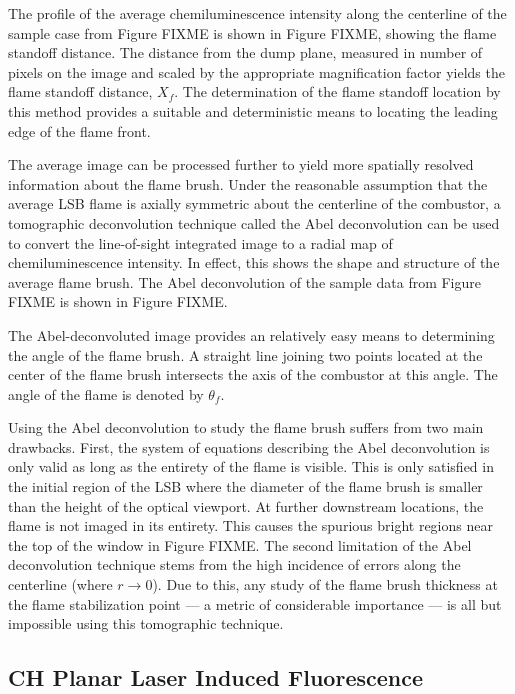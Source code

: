 The profile of the average chemiluminescence intensity along the centerline of the sample case from Figure FIXME is shown in Figure FIXME, showing the flame standoff distance.
The distance from the dump plane, measured in number of pixels on the image and scaled by the appropriate magnification factor yields the flame standoff distance, \(X_f\).
The determination of the flame standoff location by this method provides a suitable and deterministic means to locating the leading edge of the flame front.

The average image can be processed further to yield more spatially resolved information about the flame brush.
Under the reasonable assumption that the average LSB flame is axially symmetric about the centerline of the combustor, a tomographic deconvolution technique called the Abel deconvolution\cite{1992-dasch} can be used to convert the line-of-sight integrated image to a radial map of chemiluminescence intensity.
In effect, this shows the shape and structure of the average flame brush.
The Abel deconvolution of the sample data from Figure FIXME is shown in Figure FIXME.

The Abel-deconvoluted image provides an relatively easy means to determining the angle of the flame brush.
A straight line joining two points located at the center of the flame brush intersects the axis of the combustor at this angle.
The angle of the flame is denoted by \(\theta_f\).

Using the Abel deconvolution to study the flame brush suffers from two main drawbacks.
First, the system of equations describing the Abel deconvolution is only valid as long as the entirety of the flame is visible.
This is only satisfied in the initial region of the LSB where the diameter of the flame brush is smaller than the height of the optical viewport.
At further downstream locations, the flame is not imaged in its entirety.
This causes the spurious bright regions near the top of the window in Figure FIXME.
The second limitation of the Abel deconvolution technique stems from the high incidence of errors along the centerline (where \(r \to 0\)).
Due to this, any study of the flame brush thickness at the flame stabilization point --- a metric of considerable importance --- is all but impossible using this tomographic technique.

\subsection{CH Planar Laser Induced Fluorescence}


